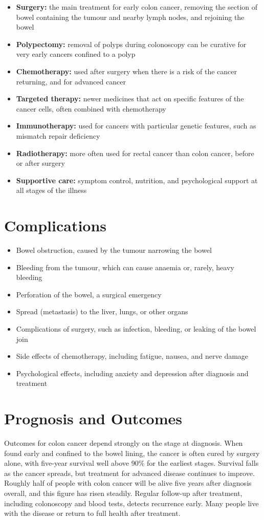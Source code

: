 \begin{itemize}
    \item \textbf{Surgery:} the main treatment for early colon cancer, removing the section of bowel containing the tumour and nearby lymph nodes, and rejoining the bowel
    \item \textbf{Polypectomy:} removal of polyps during colonoscopy can be curative for very early cancers confined to a polyp
    \item \textbf{Chemotherapy:} used after surgery when there is a risk of the cancer returning, and for advanced cancer
    \item \textbf{Targeted therapy:} newer medicines that act on specific features of the cancer cells, often combined with chemotherapy
    \item \textbf{Immunotherapy:} used for cancers with particular genetic features, such as mismatch repair deficiency
    \item \textbf{Radiotherapy:} more often used for rectal cancer than colon cancer, before or after surgery
    \item \textbf{Supportive care:} symptom control, nutrition, and psychological support at all stages of the illness
\end{itemize}

\section*{Complications}
\begin{itemize}
    \item Bowel obstruction, caused by the tumour narrowing the bowel
    \item Bleeding from the tumour, which can cause anaemia or, rarely, heavy bleeding
    \item Perforation of the bowel, a surgical emergency
    \item Spread (metastasis) to the liver, lungs, or other organs
    \item Complications of surgery, such as infection, bleeding, or leaking of the bowel join
    \item Side effects of chemotherapy, including fatigue, nausea, and nerve damage
    \item Psychological effects, including anxiety and depression after diagnosis and treatment
\end{itemize}

\section*{Prognosis and Outcomes}
Outcomes for colon cancer depend strongly on the stage at diagnosis. When found early and confined to the bowel lining, the cancer is often cured by surgery alone, with five-year survival well above 90\% for the earliest stages. Survival falls as the cancer spreads, but treatment for advanced disease continues to improve. Roughly half of people with colon cancer will be alive five years after diagnosis overall, and this figure has risen steadily. Regular follow-up after treatment, including colonoscopy and blood tests, detects recurrence early. Many people live with the disease or return to full health after treatment.

